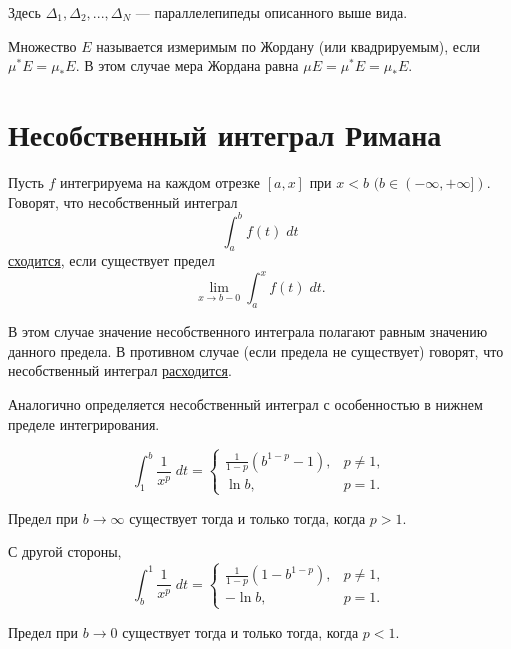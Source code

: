     Здесь $\Delta_1, \Delta_2, ..., \Delta_N$ — параллелепипеды описанного выше вида.
    
    \begin{definition}
    	Множество $E$ называется измеримым по Жордану (или
    	квадрируемым), если $\mu^{*}E = \mu_{*}E$. В этом случае мера Жордана равна $\mu E = \mu^{*}E = \mu_{*}E$.
    \end{definition}
    
    \section{Несобственный интеграл Римана}
    
    \begin{definition}
    	Пусть $f$ интегрируема на каждом отрезке $[a, x]$ при $x < b$ $(b \in (-\infty, +\infty])$. Говорят, что несобственный интеграл
    	\[ \int_a^b f(t) \; dt \]
    	\underline{сходится}, если существует предел
    	\[ \lim_{x \to b - 0} \int_a^x f(t) \; dt. \]
    
	    В этом случае значение несобственного интеграла полагают равным значению данного предела. В противном случае (если предела не существует) говорят, что несобственный интеграл \underline{расходится}.
	    
	    Аналогично определяется несобственный интеграл с особенностью в нижнем пределе интегрирования.
	\end{definition}
	
	\begin{example}
	    \begin{equation*}
	    	\int_1^b \frac{1}{x^p} \; dt = 
		    \begin{cases}
		    	\frac{1}{1 - p}(b^{1 - p} - 1), & p \neq 1, \\
		    	\ln{b}, & p = 1.
		    \end{cases}
	    \end{equation*}
	    
	    Предел при $b \rightarrow \infty$ существует тогда и только тогда, когда $p > 1$.
	    
	    С другой стороны,
	    \begin{equation*}
	    	\int_b^1 \frac{1}{x^p} \; dt = 
	    	\begin{cases}
	    		\frac{1}{1 - p}(1 - b^{1 - p}), & p \neq 1, \\
	    		-\ln{b}, & p = 1.
	    	\end{cases}
	    \end{equation*}
	    
	    Предел при $b \rightarrow 0$ существует тогда и только тогда, когда $p < 1$.
	\end{example}
	
